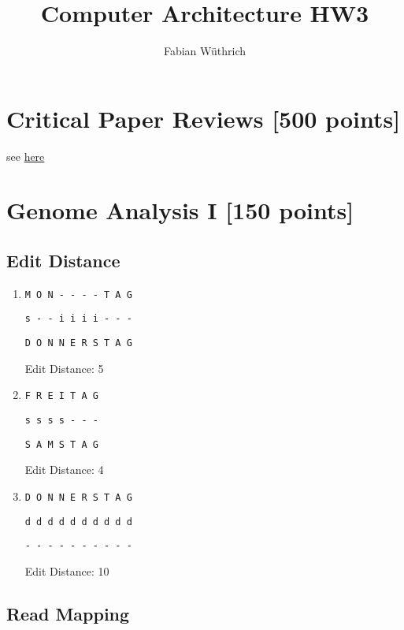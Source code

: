 \documentclass[a4paper]{article}
\title{Computer Architecture HW3}
\author{Fabian Wüthrich}
\begin{document}
\maketitle

\section{Critical Paper Reviews [500 points]}

see \href{https://safari.ethz.ch/review/architecture20/}{here}

\section{Genome Analysis I [150 points]}

\subsection{Edit Distance}

\begin{enumerate}[label=\alph*)]
    \item \texttt{M O N - - - - T A G} 

          \texttt{s - - i i i i - - -} 
        
          \texttt{D O N N E R S T A G} 

          Edit Distance: 5
    \item \texttt{F R E I T A G}

          \texttt{s s s s - - -}
          
          \texttt{S A M S T A G}

          Edit Distance: 4
    \item \texttt{D O N N E R S T A G}
              
          \texttt{d d d d d d d d d d}

          \texttt{- - - - - - - - - -}

          Edit Distance: 10
\end{enumerate}

\subsection{Read Mapping}
\end{document}

